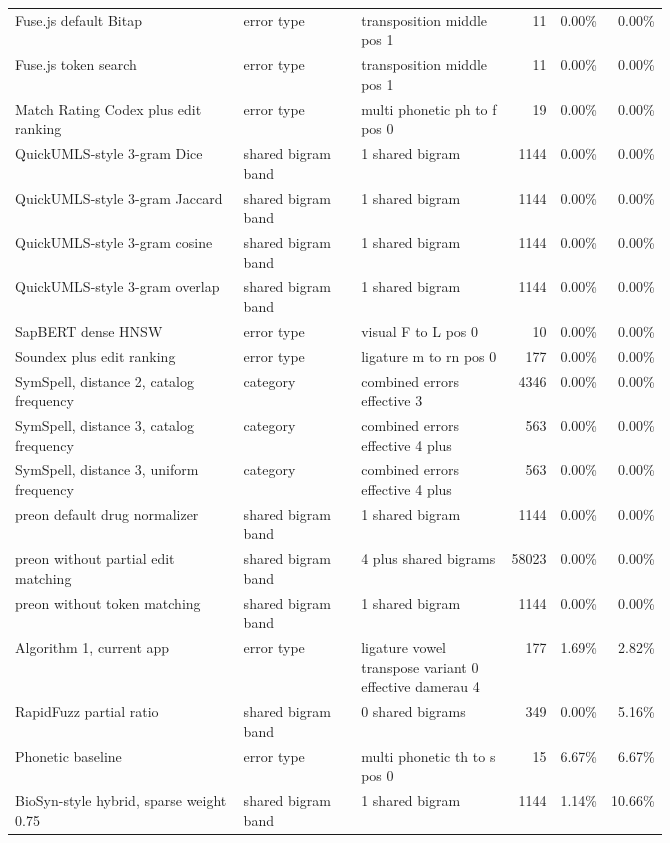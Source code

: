 \begin{scriptsize}
\begin{longtable}{@{}L{0.35\linewidth}L{0.18\linewidth}L{0.23\linewidth}rrr@{}}
Fuse.js default Bitap & error type & transposition middle pos 1 & 11 & 0.00\% & 0.00\% \\
Fuse.js token search & error type & transposition middle pos 1 & 11 & 0.00\% & 0.00\% \\
Match Rating Codex plus edit ranking & error type & multi phonetic ph to f pos 0 & 19 & 0.00\% & 0.00\% \\
QuickUMLS-style 3-gram Dice & shared bigram band & 1 shared bigram & 1144 & 0.00\% & 0.00\% \\
QuickUMLS-style 3-gram Jaccard & shared bigram band & 1 shared bigram & 1144 & 0.00\% & 0.00\% \\
QuickUMLS-style 3-gram cosine & shared bigram band & 1 shared bigram & 1144 & 0.00\% & 0.00\% \\
QuickUMLS-style 3-gram overlap & shared bigram band & 1 shared bigram & 1144 & 0.00\% & 0.00\% \\
SapBERT dense HNSW & error type & visual F to L pos 0 & 10 & 0.00\% & 0.00\% \\
Soundex plus edit ranking & error type & ligature m to rn pos 0 & 177 & 0.00\% & 0.00\% \\
SymSpell, distance 2, catalog frequency & category & combined errors effective 3 & 4346 & 0.00\% & 0.00\% \\
SymSpell, distance 3, catalog frequency & category & combined errors effective 4 plus & 563 & 0.00\% & 0.00\% \\
SymSpell, distance 3, uniform frequency & category & combined errors effective 4 plus & 563 & 0.00\% & 0.00\% \\
preon default drug normalizer & shared bigram band & 1 shared bigram & 1144 & 0.00\% & 0.00\% \\
preon without partial edit matching & shared bigram band & 4 plus shared bigrams & 58023 & 0.00\% & 0.00\% \\
preon without token matching & shared bigram band & 1 shared bigram & 1144 & 0.00\% & 0.00\% \\
Algorithm 1, current app & error type & ligature vowel transpose variant 0  effective damerau 4 & 177 & 1.69\% & 2.82\% \\
RapidFuzz partial ratio & shared bigram band & 0 shared bigrams & 349 & 0.00\% & 5.16\% \\
Phonetic baseline & error type & multi phonetic th to s pos 0 & 15 & 6.67\% & 6.67\% \\
BioSyn-style hybrid, sparse weight 0.75 & shared bigram band & 1 shared bigram & 1144 & 1.14\% & 10.66\% \\

\end{longtable}
\end{scriptsize}

